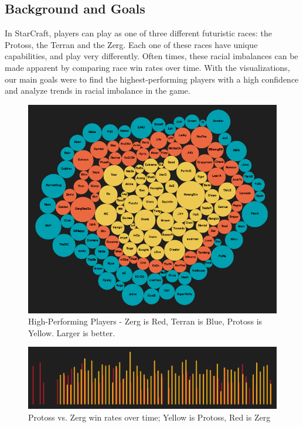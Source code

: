 \subsection{Background and Goals}
In StarCraft, players can play as one of three different futuristic races: the Protoss, the Terran and the Zerg.  Each one of these races have unique capabilities, and play very differently.  Often times, these racial imbalances can be made apparent by comparing race win rates over time.  With the visualizations, our main goals were to find the highest-performing players with a high confidence and analyze trends in racial imbalance in the game.

\begin{figure}[t]
  \centering
  \includegraphics[scale=.35]{pics/bubble_players.png}
  \caption{High-Performing Players - Zerg is Red, Terran is Blue, Protoss is Yellow.  Larger is better.}
\end{figure}
\begin{figure}[t]
  \centering
  \includegraphics[scale=.25]{pics/bars_zvp.png}
  \caption{Protoss vs. Zerg win rates over time; Yellow is Protoss, Red is Zerg}
\end{figure}

